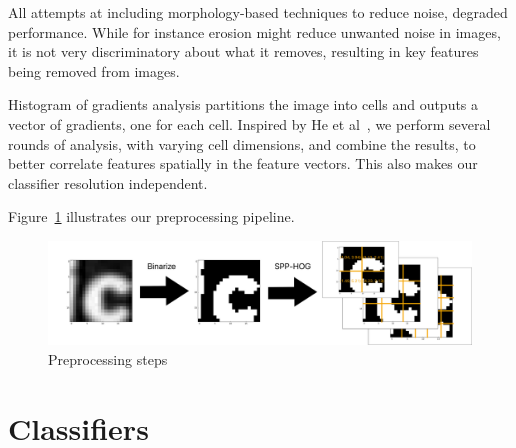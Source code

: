 \documentclass[paper=a4, fontsize=11pt]{scrartcl} %
\numberwithin{equation}{section} %
\numberwithin{figure}{section} %
\numberwithin{table}{section} %
\begin{document}
All attempts at including morphology-based techniques to reduce noise,
degraded performance.  While for instance erosion might reduce
unwanted noise in images, it is not very discriminatory about what it
removes, resulting in key features being removed from images.

Histogram of gradients analysis partitions the image into cells and
outputs a vector of gradients, one for each cell.  Inspired by He et
al~\cite{bib:spp}, we perform several rounds of analysis, with varying
cell dimensions, and combine the results, to better correlate features
spatially in the feature vectors. This also makes our classifier
resolution independent.

Figure~\ref{fig:preprocessing} illustrates our preprocessing pipeline.

\begin{figure}[H]
    \centering
    \includegraphics[width=0.8\linewidth]{img/preprocessing.pdf}
    \caption{Preprocessing steps} \label{fig:preprocessing}
\end{figure}

\section{Classifiers}
\end{document}

